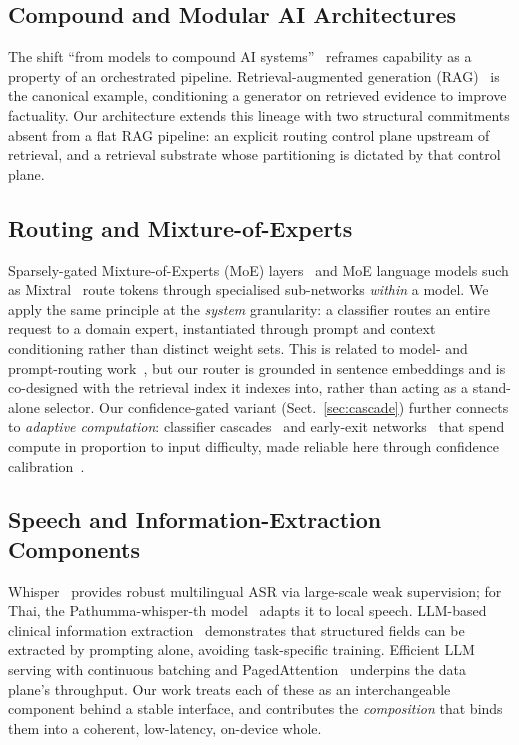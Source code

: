 \documentclass[runningheads]{llncs}
\begin{document}
\subsection{Compound and Modular AI Architectures}

The shift ``from models to compound AI systems''~\cite{compoundai} reframes capability as a property of an orchestrated pipeline. Retrieval-augmented generation (RAG)~\cite{lewis2020} is the canonical example, conditioning a generator on retrieved evidence to improve factuality. Our architecture extends this lineage with two structural commitments absent from a flat RAG pipeline: an explicit routing control plane upstream of retrieval, and a retrieval substrate whose partitioning is dictated by that control plane.

\subsection{Routing and Mixture-of-Experts}

Sparsely-gated Mixture-of-Experts (MoE) layers~\cite{shazeer2017} and MoE language models such as Mixtral~\cite{mixtral} route tokens through specialised sub-networks \emph{within} a model. We apply the same principle at the \emph{system} granularity: a classifier routes an entire request to a domain expert, instantiated through prompt and context conditioning rather than distinct weight sets. This is related to model- and prompt-routing work~\cite{lu2023}, but our router is grounded in sentence embeddings and is co-designed with the retrieval index it indexes into, rather than acting as a stand-alone selector. Our confidence-gated variant (Sect.~\ref{sec:cascade}) further connects to \emph{adaptive computation}: classifier cascades~\cite{viola2001} and early-exit networks~\cite{teerapittayanon2016} that spend compute in proportion to input difficulty, made reliable here through confidence calibration~\cite{guo2017}.

\subsection{Speech and Information-Extraction Components}

Whisper~\cite{radford2023} provides robust multilingual ASR via large-scale weak supervision; for Thai, the Pathumma-whisper-th model~\cite{pathumma} adapts it to local speech. LLM-based clinical information extraction~\cite{agrawal2022} demonstrates that structured fields can be extracted by prompting alone, avoiding task-specific training. Efficient LLM serving with continuous batching and PagedAttention~\cite{kwon2023} underpins the data plane's throughput. Our work treats each of these as an interchangeable component behind a stable interface, and contributes the \emph{composition} that binds them into a coherent, low-latency, on-device whole.
\end{document}
